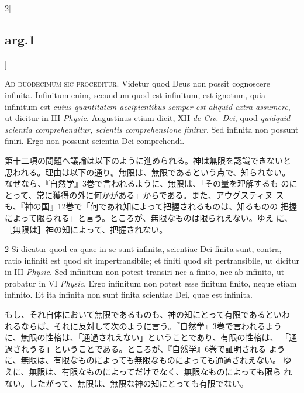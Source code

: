 \documentclass[paper=a4paper,fontsize=10pt,jafontsize=9pt,titlepage]{jlreq}
\begin{document}
\begin{paracol}{2}[\subsection{arg.1}]

{\huge A}{\scshape d duodecimum sic proceditur}. Videtur quod Deus non
possit cognoscere infinita. Infinitum enim, secundum quod est
infinitum, est ignotum, quia infinitum est {\itshape cuius quantitatem
accipientibus semper est aliquid extra assumere}, ut dicitur in III
{\itshape Physic}. Augustinus etiam dicit, XII {\itshape de Civ.~Dei},
quod {\itshape quidquid scientia comprehenditur, scientis
comprehensione finitur}. Sed infinita non possunt finiri. Ergo non
possunt scientia Dei comprehendi.

\switchcolumn

第十二項の問題へ議論は以下のように進められる。神は無限を認識できないと
思われる。理由は以下の通り。無限は、無限であるという点で、知られない。
なぜなら、『自然学』3巻で言われるように、無限は、「その量を理解するも
のにとって、常に獲得の外に何かがある」からである。また、アウグスティヌ
スも、『神の国』12巻で「何であれ知によって把握されるものは、知るものの
把握によって限られる」と言う。ところが、無限なものは限られえない。ゆえ
に、［無限は］神の知によって、把握されない。

\switchcolumn*

2 Si dicatur quod ea quae in se sunt infinita, scientiae Dei finita
sunt, contra, ratio infiniti est quod sit impertransibile; et finiti
quod sit pertransibile, ut dicitur in III {\itshape Physic}. Sed
infinitum non potest transiri nec a finito, nec ab infinito, ut
probatur in VI {\itshape Physic}. Ergo infinitum non potest esse
finitum finito, neque etiam infinito. Et ita infinita non sunt finita
scientiae Dei, quae est infinita.

\switchcolumn

もし、それ自体において無限であるものも、神の知にとって有限であるといわ
れるならば、それに反対して次のように言う。『自然学』3巻で言われるよう
に、無限の性格は、「通過されえない」ということであり、有限の性格は、
「通過されうる」ということである。ところが、『自然学』6巻で証明される
ように、無限は、有限なものによっても無限なものによっても通過されえない。
ゆえに、無限は、有限なものによってだけでなく、無限なものによっても限ら
れない。したがって、無限は、無限な神の知にとっても有限でない。



\end{paracol}
\end{document}
